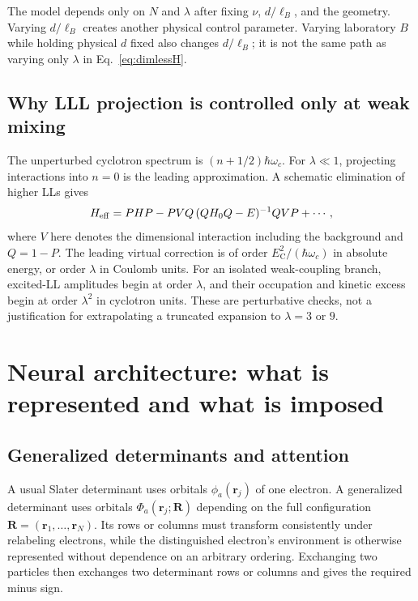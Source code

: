 \documentclass[11pt,letterpaper]{article}
\newcommand{\R}{\mathbf R}
\newcommand{\rr}{\mathbf r}
\newcommand{\EC}{E_{\mathrm C}}
\begin{document}
The model depends only on $N$ and $\lambda$ after fixing $\nu$, $d/\ell_B$, and the geometry. Varying $d/\ell_B$ creates another physical control parameter. Varying laboratory $B$ while holding physical $d$ fixed also changes $d/\ell_B$; it is not the same path as varying only $\lambda$ in Eq.~\eqref{eq:dimlessH}.

\subsection{Why LLL projection is controlled only at weak mixing}

The unperturbed cyclotron spectrum is $(n+1/2)\hbar\omega_c$. For $\lambda\ll1$, projecting interactions into $n=0$ is the leading approximation. A schematic elimination of higher LLs gives
\begin{equation}
 H_{\rm eff}=P H P-P V Q\,(QH_0Q-E)^{-1}Q V P+\cdots,
 \label{eq:schur}
\end{equation}
where $V$ here denotes the dimensional interaction including the background and $Q=1-P$. The leading virtual correction is of order $\EC^2/(\hbar\omega_c)$ in absolute energy, or order $\lambda$ in Coulomb units. For an isolated weak-coupling branch, excited-LL amplitudes begin at order $\lambda$, and their occupation and kinetic excess begin at order $\lambda^2$ in cyclotron units. These are perturbative checks, not a justification for extrapolating a truncated expansion to $\lambda=3$ or $9$.

\section{Neural architecture: what is represented and what is imposed}
\label{sec:network}

\subsection{Generalized determinants and attention}

A usual Slater determinant uses orbitals $\phi_a(\rr_j)$ of one electron. A generalized determinant uses orbitals $\Phi_a(\rr_j;\R)$ depending on the full configuration $\R=(\rr_1,\ldots,\rr_N)$. Its rows or columns must transform consistently under relabeling electrons, while the distinguished electron's environment is otherwise represented without dependence on an arbitrary ordering. Exchanging two particles then exchanges two determinant rows or columns and gives the required minus sign.
\end{document}
